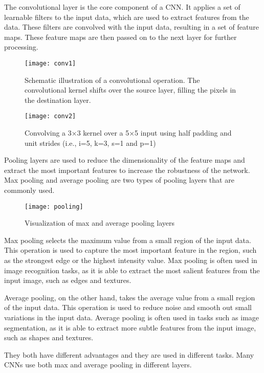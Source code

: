 The convolutional layer is the core component of a CNN.
It applies a set of learnable filters to the input data, which are used to extract features from the data.
These filters are convolved with the input data, resulting in a set of feature maps.
These feature maps are then passed on to the next layer for further processing.

\begin{figure}[H]
  \centering
  \texttt{[image: conv1]}
  \caption{Schematic illustration of a convolutional operation. The convolutional kernel shifts over the source layer, filling the pixels in the destination layer. \cite{convolutional:operation}}
\end{figure}

\begin{figure}[H]
  \centering
  \texttt{[image: conv2]}
  \caption{Convolving a 3×3 kernel over a 5×5 input using half padding
  and unit strides (i.e., i=5, k=3, s=1 and p=1) \cite{arxiv.1603.07285}}
\end{figure}

Pooling layers are used to reduce the dimensionality of the feature maps and extract the most important features to increase the robustness of the network.
Max pooling and average pooling are two types of pooling layers that are commonly used. 

\begin{figure}[H]
  \centering
  \texttt{[image: pooling]}
  \caption{Visualization of max and average pooling layers \cite{boehmke}}
\end{figure}

Max pooling selects the maximum value from a small region of the input data.
This operation is used to capture the most important feature in the region, such as the strongest edge or the highest intensity value.
Max pooling is often used in image recognition tasks, as it is able to extract the most salient features from the input image, such as edges and textures.

Average pooling, on the other hand, takes the average value from a small region of the input data. 
This operation is used to reduce noise and smooth out small variations in the input data. 
Average pooling is often used in tasks such as image segmentation, as it is able to extract more subtle features from the input image, such as shapes and textures.

They both have different advantages and they are used in different tasks.
Many CNNs use both max and average pooling in different layers.


